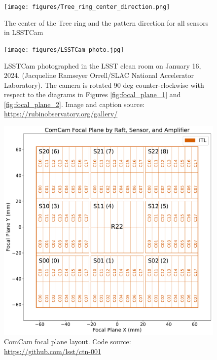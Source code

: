 \documentclass[CTN,authoryear,toc]{lsstdoc}
\begin{document}
\begin{figure}
  \centering
  \texttt{[image: figures/Tree\_ring\_center\_direction.png]}
	\caption{The center of the Tree ring and the pattern direction for all sensors in LSSTCam}
  \label{fig:Focal_Plane_TR}
\end{figure}

\clearpage
\begin{figure}
  \centering
  \texttt{[image: figures/LSSTCam\_photo.jpg]}
  \caption{LSSTCam photographed in the LSST clean room on January 16, 2024. (Jacqueline Ramseyer Orrell/SLAC National Accelerator Laboratory). The camera is rotated 90 deg counter-clockwise with respect to the diagrams in Figures \ref{fig:focal_plane_1} and \ref{fig:focal_plane_2}. Image and caption source: \url{https://rubinobservatory.org/gallery/}}
  \label{fig:focal_plane_3}
\end{figure}


\begin{figure}
  \centering
  \includegraphics[width=\textwidth]{figures/ComCam_focal_plane_CTN_001_FIG1.pdf}
  \caption{ComCam focal plane layout. Code source: \url{https://github.com/lsst/ctn-001}}
  \label{fig:comcam_focal_plane_1}
\end{figure}

\clearpage
\end{document}

